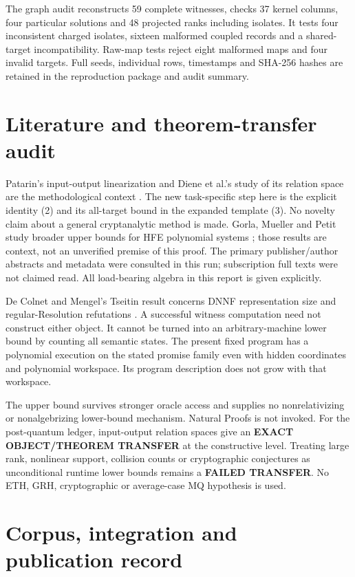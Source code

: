 \documentclass[11pt]{article}
\begin{document}
The graph audit reconstructs 59 complete witnesses, checks 37 kernel columns,
four particular solutions and 48 projected ranks including isolates. It tests
four inconsistent charged isolates, sixteen malformed coupled records and a
shared-target incompatibility. Raw-map tests reject eight malformed maps and
four invalid targets. Full seeds, individual rows, timestamps and SHA-256
hashes are retained in the reproduction package and audit summary.

\section{Literature and theorem-transfer audit}
Patarin's input-output linearization and Diene et al.'s study of its relation
space are the methodological context \cite{patarin,diene}. The new task-specific
step here is the explicit identity (2) and its all-target bound in the expanded
template (3). No novelty claim about a general cryptanalytic method is made.
Gorla, Mueller and Petit study broader upper bounds for HFE polynomial systems
\cite{hfe}; those results are context, not an unverified premise of this proof.
The primary publisher/author abstracts and metadata were consulted in this
run; subscription full texts were not claimed read. All load-bearing algebra
in this report is given explicitly.

De Colnet and Mengel's Tseitin result concerns DNNF representation size and
regular-Resolution refutations \cite{tseitin}. A successful witness computation
need not construct either object. It cannot be turned into an arbitrary-machine
lower bound by counting all semantic states. The present fixed program has a
polynomial execution on the stated promise family even with hidden coordinates
and polynomial workspace. Its program description does not grow with that
workspace.

The upper bound survives stronger oracle access and supplies no
nonrelativizing or nonalgebrizing lower-bound mechanism. Natural Proofs is not
invoked. For the post-quantum ledger, input-output relation spaces give an
\textbf{EXACT OBJECT/THEOREM TRANSFER} at the constructive level. Treating
large rank, nonlinear support, collision counts or cryptographic conjectures
as unconditional runtime lower bounds remains a \textbf{FAILED TRANSFER}.
No ETH, GRH, cryptographic or average-case MQ hypothesis is used.

\section{Corpus, integration and publication record}
\end{document}
